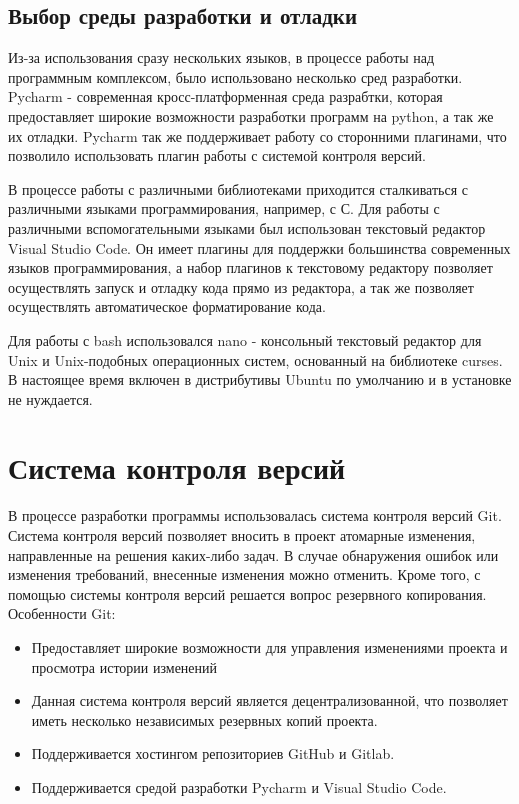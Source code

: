 \subsection{Выбор среды разработки и отладки}
Из-за использования сразу нескольких языков, в процессе работы над программным комплексом, было использовано несколько сред разработки.
Pycharm - современная кросс-платформенная среда разрабтки, которая предоставляет широкие возможности разработки программ на python, а так же их отладки. Pycharm так же поддерживает работу со сторонними плагинами, что позволило использовать плагин работы с системой контроля версий.

В процессе работы с различными библиотеками приходится сталкиваться с различными языками программирования, например, с С. Для работы с различными вспомогательными языками был использован текстовый редактор Visual Studio Code. Он имеет плагины для поддержки большинства современных языков программирования, а набор плагинов к текстовому редактору позволяет осуществлять запуск и отладку кода прямо из редактора, а так же позволяет осуществлять автоматическое форматирование кода.

Для работы с bash использовался nano - консольный текстовый редактор для Unix и Unix-подобных операционных систем, основанный на библиотеке curses. В настоящее время включен в дистрибутивы Ubuntu по умолчанию и в установке не нуждается.

\section{Система контроля версий}
В процессе разработки программы использовалась система контроля
версий Git.
Система контроля версий позволяет вносить в проект атомарные
изменения, направленные на решения каких-либо задач. В случае
обнаружения ошибок или изменения требований, внесенные изменения
можно отменить.
Кроме того, с помощью системы контроля версий решается вопрос
резервного копирования.
Особенности Git:
\begin{itemize}
\item Предоставляет широкие возможности для управления изменениями
	проекта и просмотра истории изменений
 \item Данная система контроля версий является децентрализованной, что
позволяет иметь несколько независимых резервных копий проекта.
\item Поддерживается хостингом репозиториев GitHub и Gitlab.
\item Поддерживается средой разработки Pycharm и Visual Studio Code.
\end{itemize}


